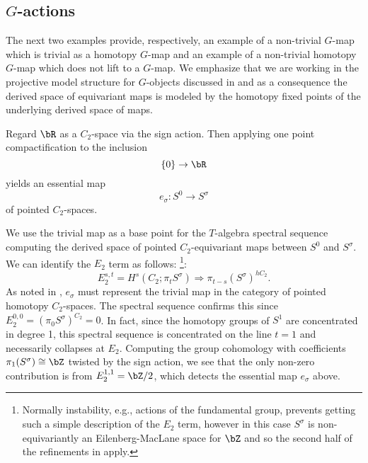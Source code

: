 \documentclass[leqno,oneside,english]{elsarticle}
\begin{document}
\subsection{\texorpdfstring{$G$}{G}-actions}\label{sec:g-action}
The next two examples provide, respectively, an example of a
non-trivial $G$-map which is trivial as a homotopy $G$-map and an
example of a non-trivial homotopy $G$-map which does not
lift to a $G$-map. We emphasize that we are working in the projective model structure for $G$-objects discussed in  and as a consequence the derived space of equivariant maps is modeled by the homotopy fixed points of the underlying derived space of maps.  

\begin{example}
  Regard $\bR$ as a $C_2$-space via the sign action.
  Then applying one point compactification to the inclusion
  \[\{0\}\rightarrow \bR\] yields an essential map
  \[e_{\sigma}\colon S^0\rightarrow S^{\sigma}\] 
  of pointed $C_2$-spaces.

  We use the trivial map as a base point for the $T$-algebra spectral sequence computing the derived space of pointed $C_2$-equivariant maps between $S^0$ and $S^\sigma$. We can identify the $E_2$ term as follows:
   \footnote{Normally instability, e.g., actions of the
     fundamental group, prevents getting such a simple description of
     the $E_2$ term, however in this case $S^\sigma$ is
     non-equivariantly an Eilenberg-MacLane space for $\bZ$ and so the
     second half of the refinements in  apply.}:
  \[ 
  E_2^{s,t}=H^s(C_2;\pi_{t} S^{\sigma})\Longrightarrow
  \pi_{t-s}(S^{\sigma})^{hC_2}. 
  \]  
  As noted in , $e_{\sigma}$ must
  represent the trivial map in the category of pointed homotopy $C_2$-spaces.
  The spectral sequence confirms this since
  $E_2^{0,0}=(\pi_0S^{\sigma})^{C_2}=0$. In fact, since the homotopy
  groups of $S^1$ are concentrated in degree 1, this spectral sequence
  is concentrated on the line $t=1$ and necessarily collapses at
  $E_2$. Computing the group cohomology with coefficients $\pi_1(S^\sigma)\cong\bZ$ twisted by the sign action, we see
  that the only non-zero contribution is from $E_2^{1,1}=\bZ/2$,
  which detects the essential map $e_{\sigma}$ above.
\end{example}
\end{document}
